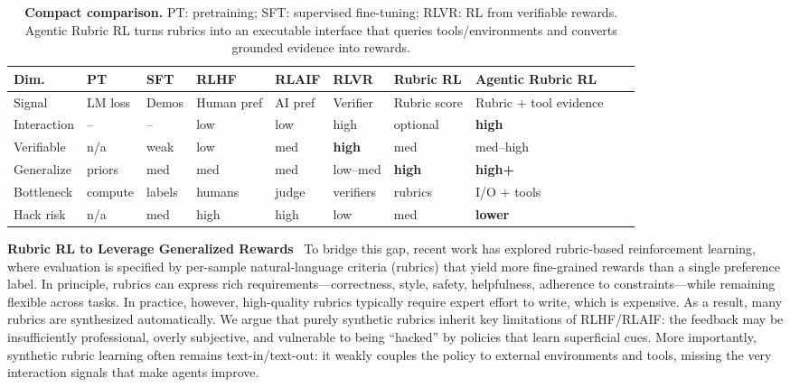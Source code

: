 \begin{table}[h]
\centering
\footnotesize
\begin{tabular}{llllllllll}
\toprule
\textbf{Dim.} &
\textbf{PT} &
\textbf{SFT} &
\textbf{RLHF} &
\textbf{RLAIF} &
\textbf{RLVR} &
\textbf{Rubric RL} &
\textbf{Agentic Rubric RL} \\
\midrule
Signal
& LM loss
& Demos
& Human pref
& AI pref
& Verifier
& Rubric score
& Rubric + tool evidence \\

Interaction
& --
& --
& low
& low
& high
& optional
& \textbf{high} \\

Verifiable
& n/a
& weak
& low
& med
& \textbf{high}
& med
& med--high \\

Generalize
& priors
& med
& med
& med
& low--med
& \textbf{high}
& \textbf{high+} \\

Bottleneck
& compute
& labels
& humans
& judge
& verifiers
& rubrics
& I/O + tools \\

Hack risk
& n/a
& med
& high
& high
& low
& med
& \textbf{lower} \\
\bottomrule
\end{tabular}

\vspace{2pt}
\caption{\textbf{Compact comparison.}
PT: pretraining; SFT: supervised fine-tuning; RLVR: RL from verifiable rewards.
Agentic Rubric RL turns rubrics into an executable interface that queries tools/environments and converts grounded evidence into rewards.}
\label{tab:compact-paradigm}
\end{table}




\textbf{Rubric RL to Leverage Generalized Rewards}~
To bridge this gap, recent work has explored rubric-based reinforcement learning, where evaluation is specified by per-sample natural-language criteria (rubrics) that yield more fine-grained rewards than a single preference label. In principle, rubrics can express rich requirements—correctness, style, safety, helpfulness, adherence to constraints—while remaining flexible across tasks. In practice, however, high-quality rubrics typically require expert effort to write, which is expensive. As a result, many rubrics are synthesized automatically. We argue that purely synthetic rubrics inherit key limitations of RLHF/RLAIF: the feedback may be insufficiently professional, overly subjective, and vulnerable to being “hacked” by policies that learn superficial cues. More importantly, synthetic rubric learning often remains text-in/text-out: it weakly couples the policy to external environments and tools, missing the very interaction signals that make agents improve.

